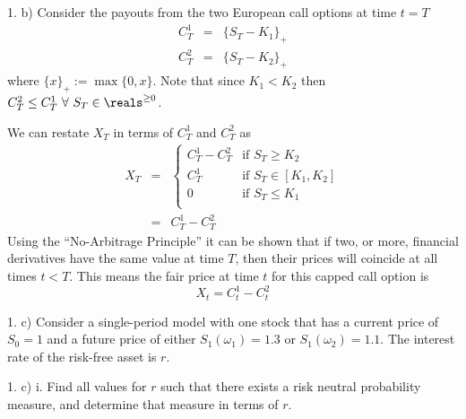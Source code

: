 \documentclass[11pt,a4paper]{article}
\begin{document}
\begin{answer}{1. b)}
  Consider the payouts from the two European call options at time $t=T$
  \[\begin{array}{rcl}
    C_T^1&=&\{S_T-K_1\}_+\\
    C_T^2&=&\{S_T-K_2\}_+
  \end{array}\]
  where $\{x\}_+:=\max\{0,x\}$. Note that since $K_1<K_2$ then $C_T^2\leq C_T^1\ \forall\ S_T\in\reals^{\geq0}$.
  \par We can restate $X_T$ in terms of $C_T^1$ and $C_T^2$ as
  \[\begin{array}{rcl}
    X_T&=&\begin{cases}
      C_T^1-C_T^2&\text{if }S_T\geq K_2\\
      C_T^1&\text{if }S_T\in[K_1,K_2]\\
      0&\text{if }S_T\leq K_1\\
    \end{cases}\\
    &=&C_T^1-C_T^2
  \end{array}\]
  Using the ``No-Arbitrage Principle'' it can be shown that if two, or more, financial derivatives have the same value at time $T$, then their prices will coincide at all times $t<T$. This means the fair price at time $t$ for this capped call option is
  \[ X_t=C_t^1-C_t^2 \]
\end{answer}

\begin{question}{1. c)}
  Consider a single-period model with one stock that has a current price of $S_0=1$ and a future price of either $S_1(\omega_1)=1.3$ or $S_1(\omega_2)=1.1$. The interest rate of the risk-free asset is $r$.
\end{question}

\begin{question}{1. c) i.}
  Find all values for $r$ such that there exists a risk neutral probability measure, and determine that measure in terms of $r$.
\end{question}
\end{document}
